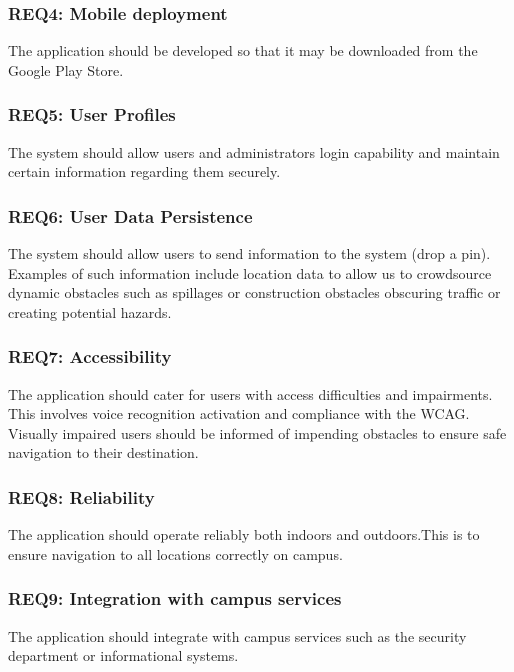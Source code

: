 		\subsubsection{REQ4: Mobile deployment}
			The application should be developed so that it may be downloaded from the Google Play Store. %
		
		\subsubsection{REQ5: User Profiles}
			The system should allow users and administrators login capability and maintain certain information regarding them securely. %
			
		\subsubsection{REQ6: User Data Persistence}
			The system should allow users to send information to the system (drop a pin). Examples of such information include location data to allow us to crowdsource dynamic obstacles such as spillages or construction obstacles obscuring traffic or creating potential hazards.%
			
		\subsubsection{REQ7: Accessibility}
			The application should cater for users with access difficulties and impairments. This involves voice recognition activation and compliance with the WCAG.
			Visually impaired users should be informed of impending obstacles to ensure safe navigation to their destination.

		\subsubsection{REQ8: Reliability}
			The application should operate reliably both indoors and outdoors.This is to ensure navigation to all locations correctly on campus.
			
		\subsubsection{REQ9: Integration with campus services}
			The application should integrate with campus services such as the security department or informational systems.
			
